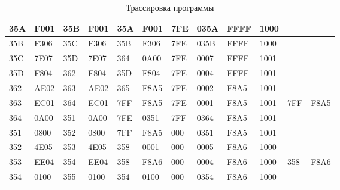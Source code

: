 \begin{table}[!ht]
\begin{tabular}{|l|l|l|l|l|l|l|l|l|l|l|l|}
        35A & F001 & 35B & F001 & 35A & F001 & 7FE & 035A & FFFF & 1000 & ~ & ~ \\ \hline
        35B & F306 & 35C & F306 & 35B & F306 & 7FE & 035B & FFFF & 1000 & ~ & ~ \\ \hline
        35C & 7E07 & 35D & 7E07 & 364 & 0A00 & 7FE & 0007 & FFFF & 1001 & ~ & ~ \\ \hline
        35D & F804 & 362 & F804 & 35D & F804 & 7FE & 0004 & FFFF & 1001 & ~ & ~ \\ \hline
        362 & AE02 & 363 & AE02 & 365 & F8A5 & 7FE & 0002 & F8A5 & 1001 & ~ & ~ \\ \hline
        363 & EC01 & 364 & EC01 & 7FF & F8A5 & 7FE & 0001 & F8A5 & 1001 & 7FF & F8A5 \\ \hline
        364 & 0A00 & 351 & 0A00 & 7FE & 0351 & 7FF & 0364 & F8A5 & 1001 & ~ & ~ \\ \hline
        351 & 0800 & 352 & 0800 & 7FF & F8A5 & 000 & 0351 & F8A5 & 1001 & ~ & ~ \\ \hline
        352 & 4E05 & 353 & 4E05 & 358 & 0001 & 000 & 0005 & F8A6 & 1000 & ~ & ~ \\ \hline
        353 & EE04 & 354 & EE04 & 358 & F8A6 & 000 & 0004 & F8A6 & 1000 & 358 & F8A6 \\ \hline
        354 & 0100 & 355 & 0100 & 354 & 0100 & 000 & 0354 & F8A6 & 1000 & ~ & ~ \\ \hline
    \end{tabular}
    \caption{Трассировка программы}
\end{table}